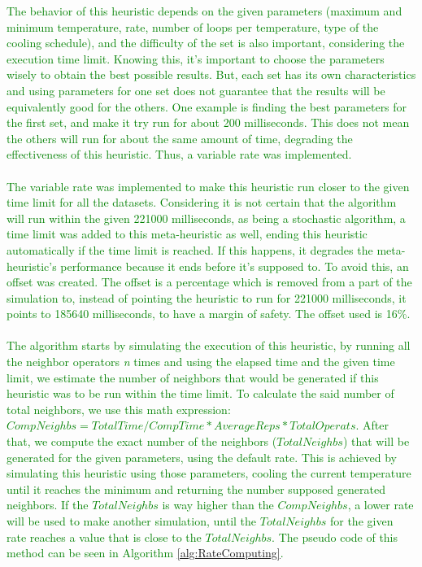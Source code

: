 \textcolor{green}{The behavior of this heuristic depends on the given parameters (maximum and minimum temperature, rate, number of loops per temperature, type of the cooling schedule), and the difficulty of the set is also important, considering the execution time limit. Knowing this, it's important to choose the parameters wisely to obtain the best possible results. But, each set has its own characteristics and using parameters for one set does not guarantee that the results will be equivalently good for the others. One example is finding the best parameters for the first set, and make it try run for about 200 milliseconds. This does not mean the others will run for about the same amount of time, degrading the effectiveness of this heuristic. Thus, a variable rate was implemented.\\
\\
The variable rate was implemented to make this heuristic run closer to the given time limit for all the datasets. Considering it is not certain that the algorithm will run within the given 221000 milliseconds, as being a stochastic algorithm, a time limit was added to this meta-heuristic as well, ending this heuristic automatically if the time limit is reached. If this happens, it degrades the meta-heuristic's performance because it ends before it's supposed to. To avoid this, an offset was created. The offset is a percentage which is removed from a part of the simulation to, instead of pointing the heuristic to run for 221000 milliseconds, it points to 185640 milliseconds, to have a margin of safety. The offset used is 16\%.\\
\\
The algorithm starts by simulating the execution of this heuristic, by running all the neighbor operators \textit{n} times and using the elapsed time and the given time limit, we estimate the number of neighbors that would be generated if this heuristic was to be run within the time limit. To calculate the said number of total neighbors, we use this math expression: $CompNeighbs = TotalTime / CompTime * AverageReps * TotalOperats$. After that, we compute the exact number of the neighbors ($TotalNeighbs$) that will be generated for the given parameters, using the default rate. This is achieved by simulating this heuristic using those parameters, cooling the current temperature until it reaches the minimum and returning the number supposed generated neighbors. If the $TotalNeighbs$ is way higher than the $CompNeighbs$, a lower rate will be used to make another simulation, until the $TotalNeighbs$ for the given rate reaches a value that is close to the $TotalNeighbs$. The pseudo code of this method can be seen in Algorithm \ref{alg:RateComputing}.\\
}

